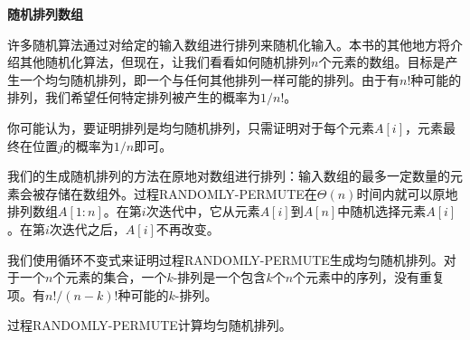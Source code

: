 \documentclass[lang=cn,newtx,10pt,scheme=chinese]{elegantbook}
\begin{document}
\textbf{随机排列数组}

许多随机算法通过对给定的输入数组进行排列来随机化输入。本书的其他地方将介绍其他随机化算法，但现在，让我们看看如何随机排列$n$个元素的数组。目标是产生一个均匀随机排列，即一个与任何其他排列一样可能的排列。由于有$n!$种可能的排列，我们希望任何特定排列被产生的概率为$1/n!$。

你可能认为，要证明排列是均匀随机排列，只需证明对于每个元素$A[i]$，元素最终在位置$j$的概率为$1/n$即可。

我们的生成随机排列的方法在原地对数组进行排列：输入数组的最多一定数量的元素会被存储在数组外。过程RANDOMLY-PERMUTE在$\Theta(n)$时间内就可以原地排列数组$A[1:n]$。在第$i$次迭代中，它从元素$A[i]$到$A[n]$中随机选择元素$A[i]$。在第$i$次迭代之后，$A[i]$不再改变。

我们使用循环不变式来证明过程RANDOMLY-PERMUTE生成均匀随机排列。对于一个$n$个元素的集合，一个$k$-排列是一个包含$k$个$n$个元素中的序列，没有重复项。有$n!/(n-k)$!种可能的$k$-排列。

\begin{lemma}{}{}
过程RANDOMLY-PERMUTE计算均匀随机排列。
\end{lemma}
\end{document}
